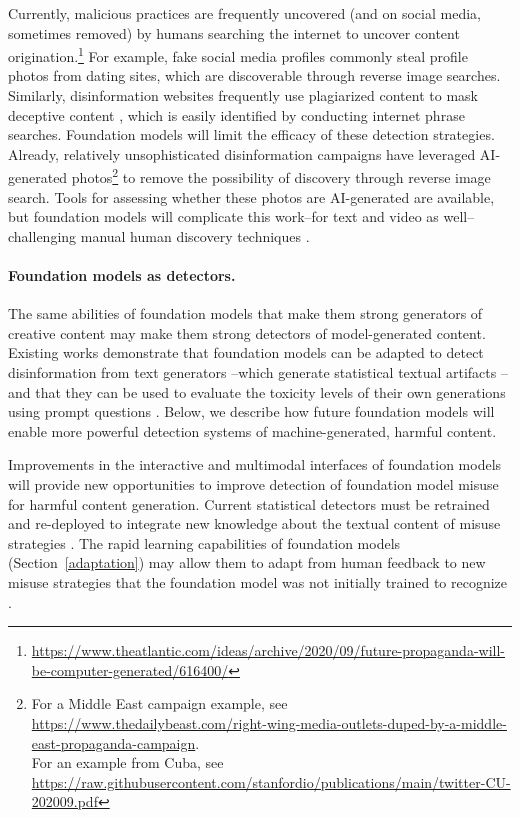 Currently, malicious practices are frequently uncovered (and on social media, sometimes removed) by humans searching the internet to uncover content origination.\footnote{\href{https://www.theatlantic.com/ideas/archive/2020/09/future-propaganda-will-be-computer-generated/616400/}{{ https://www.theatlantic.com/ideas/archive/2020/09/future-propaganda-will-be-computer-generated/616400/}}} For example, fake social media profiles commonly steal profile photos from dating sites, which are discoverable through reverse image searches. Similarly, disinformation websites frequently use plagiarized content to mask deceptive content \citep{DiResta2019PotemkinP}, which is easily identified by conducting internet phrase searches. Foundation models will limit the efficacy of these detection strategies. Already, relatively unsophisticated disinformation campaigns have leveraged AI-generated photos\footnote{For a Middle East campaign example, see \url{https://www.thedailybeast.com/right-wing-media-outlets-duped-by-a-middle-east-propaganda-campaign}. \\For an example from Cuba, see \url{https://raw.githubusercontent.com/stanfordio/publications/main/twitter-CU-202009.pdf}} to remove the possibility of discovery through reverse image search. Tools for assessing whether these photos are AI-generated are available, but foundation models will complicate this work--for text and video as well--challenging manual human discovery techniques \citep{Ippolito2020AutomaticDO,clark2021all}. 

\paragraph{Foundation models as detectors.} The same abilities of foundation models that make them strong generators of creative content may make them strong detectors of model-generated content. Existing works demonstrate that foundation models can be adapted to detect disinformation from text generators \citep{zellers2019neuralfakenews}--which generate statistical textual artifacts \citep{Holtzman2020TheCC}--and that they can be used to evaluate the toxicity levels of their own generations using prompt questions \citep{Schick2021SelfDiagnosisAS}. Below, we describe how future foundation models will enable more powerful detection systems of machine-generated, harmful content.

Improvements in the interactive and multimodal interfaces of foundation models will provide new opportunities to improve detection of foundation model misuse for harmful content generation. Current statistical detectors must be retrained and re-deployed to integrate new knowledge about the textual content of misuse strategies \citep{Dinan2019BuildIB}. The rapid learning capabilities of foundation models (Section~\ref{adaptation}) may allow them to adapt from human feedback to new misuse strategies that the foundation model was not initially trained to recognize \citep{Lee2021TowardsFF}.


